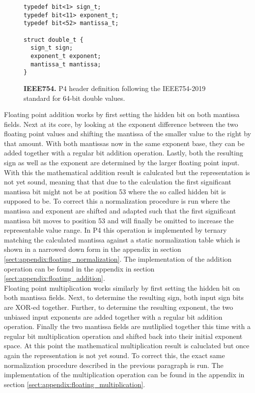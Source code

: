 \captionsetup[figure]{skip=-10pt} %
\begin{figure}[ht]
  \begin{lstlisting}[style=P4, basicstyle=\ttfamily]
typedef bit<1> sign_t;
typedef bit<11> exponent_t;
typedef bit<52> mantissa_t;

struct double_t {
  sign_t sign;
  exponent_t exponent;
  mantissa_t mantissa;
}\end{lstlisting}
  \caption[Double header definition in P4]{
    \textbf{IEEE754.} P4 header definition following the IEEE754-2019 standard for 64-bit double values.
  }
  \label{fig:double_header}
\end{figure}

Floating point addition works by first setting the hidden bit on both mantissa fields. Next at its core, by looking at the exponent difference between the two floating point values and shifting the mantissa of the smaller value to the right by that amount. With both mantissas now in the same exponent base, they can be added together with a regular bit addition operation. Lastly, both the resulting sign as well as the exponent are determined by the larger floating point input. With this the mathematical addition result is calulcated but the representation is not yet sound, meaning that that due to the calculation the first significant mantissa bit might not be at position 53 where the so called hidden bit is supposed to be. To correct this a normalization procedure is run where the mantissa and exponent are shifted and adapted such that the first significant mantissa bit moves to position 53 and will finally be omitted to increase the representable value range. In P4 this operation is implemented by ternary matching the calculated mantissa against a static normalization table which is shown in a narrowed down form in the appendix in section \ref{sect:appendix:floating_normalization}. The implementation of the addition operation can be found in the appendix in section \ref{sect:appendix:floating_addition}.\\

Floating point multiplication works similarly by first setting the hidden bit on both mantissa fields. Next, to determine the resulting sign, both input sign bits are XOR-ed together. Further, to determine the resulting exponent, the two unbiased input exponents are added together with a regular bit addition operation. Finally the two mantissa fields are mutliplied together this time with a regular bit multiplication operation and shifted back into their initial exponent space. At this point the mathematical multiplication result is caluclated but once again the representation is not yet sound. To correct this, the exact same normalization procedure described in the previous paragraph is run. The implementation of the multiplication operation can be found in the appendix in section \ref{sect:appendix:floating_multiplication}.\\

